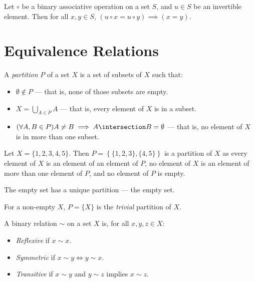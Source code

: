 \documentclass[12pt]{article}
\begin{document}
\begin{cor}
    Let $\circ$ be a binary associative operation on a set $S$, and $u \in S$ be an invertible element. Then for all $x, y \in S$, $(u \circ x = u \circ y) \implies (x = y)$.
\end{cor}

\section{Equivalence Relations}

\begin{defn}\label{partition}
    A \emph{partition} $P$ of a set $X$ is a set of subsets of $X$ such that:
    \begin{itemize}
        \item $\emptyset \notin P$ --- that is, none of those subsets are empty.
        \item $X = \bigcup_{A\in P}A$ --- that is, every element of $X$ is in a subset.
        \item $(\forall A, B \in P) A \neq B \implies A \intersection B = \emptyset$ --- that is, no element of $X$ is in more than one subset.
    \end{itemize}
\end{defn}

\begin{exmp}
    Let $X = \{1, 2, 3, 4, 5\}$. Then $P = \left\{\{1, 2, 3\}, \{4, 5\}\right\}$ is a partition of $X$ as every element of $X$ is an element of an element of $P$, no element of $X$ is an element of more than one element of $P$, and no element of $P$ is empty.
\end{exmp}

\begin{exmp}
    The empty set has a unique partition --- the empty set.
\end{exmp}

\begin{defn}
    For a non-empty $X$, $P = \{X\}$ is the \emph{trivial} partition of $X$.
\end{defn}

\begin{defn}
    A binary relation $\sim$ on a set $X$ is, for all $x, y, z \in X$:
    \begin{itemize}
        \item \emph{Reflexive} if $x \sim x$.
        \item \emph{Symmetric} if $x \sim y \iff y \sim x$.
        \item \emph{Transitive} if $x \sim y$ and $y \sim z$ implies $x \sim z$.
    \end{itemize}
\end{defn}
\end{document}
